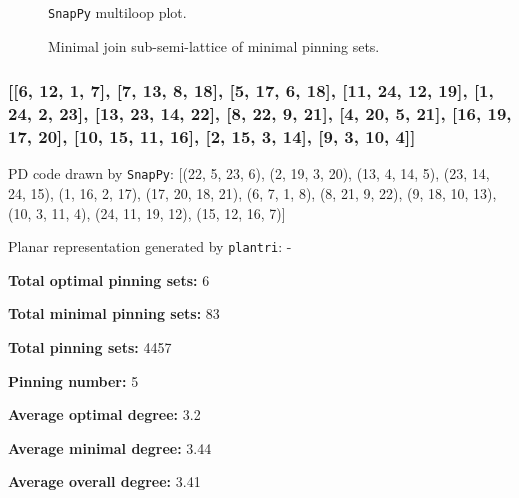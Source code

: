 \documentclass{article}%
\begin{document}
\begin{multicols}{2}
\begin{figure}[H]
\centering

\caption{\texttt{SnapPy} multiloop plot.}
\label{fig:tex/img/[[6, 12, 1, 7], [7, 13, 8, 18], [5, 24, 6, 19], [11, 23, 12, 24], [1, 14, 2, 13], [8, 2, 9, 3], [17, 19, 18, 20], [4, 16, 5, 17], [10, 15, 11, 16], [22, 14, 23, 15], [9, 22, 10, 21], [3, 21, 4, 20]].svg}
\end{figure}
\columnbreak

\begin{figure}[H]
\centering
\scalebox{0.8}{}
\caption{Minimal join sub-semi-lattice of minimal pinning sets.}
\label{fig:tex/img/[[6, 12, 1, 7], [7, 13, 8, 18], [5, 24, 6, 19], [11, 23, 12, 24], [1, 14, 2, 13], [8, 2, 9, 3], [17, 19, 18, 20], [4, 16, 5, 17], [10, 15, 11, 16], [22, 14, 23, 15], [9, 22, 10, 21], [3, 21, 4, 20]].pgf}
\end{figure}
\end{multicols}

\newpage

\subsubsection{[[6, 12, 1, 7], [7, 13, 8, 18], [5, 17, 6, 18], [11, 24, 12, 19], [1, 24, 2, 23], [13, 23, 14, 22], [8, 22, 9, 21], [4, 20, 5, 21], [16, 19, 17, 20], [10, 15, 11, 16], [2, 15, 3, 14], [9, 3, 10, 4]]}

{\small\noindent PD code drawn by \texttt{SnapPy}: [(22, 5, 23, 6), (2, 19, 3, 20), (13, 4, 14, 5), (23, 14, 24, 15), (1, 16, 2, 17), (17, 20, 18, 21), (6, 7, 1, 8), (8, 21, 9, 22), (9, 18, 10, 13), (10, 3, 11, 4), (24, 11, 19, 12), (15, 12, 16, 7)]}

{\small\noindent Planar representation generated by \texttt{plantri}: -}

\begin{multicols}{2}
{\normalsize \noindent\textbf{Total optimal pinning sets:} 6

\noindent\textbf{Total minimal pinning sets:} 83

\noindent\textbf{Total pinning sets:} 4457

\noindent\textbf{Pinning number:} 5

}
\columnbreak

{\normalsize \noindent\textbf{Average optimal degree:} 3.2

\noindent\textbf{Average minimal degree:} 3.44

\noindent\textbf{Average overall degree:} 3.41

}
\end{multicols}
\end{document}
